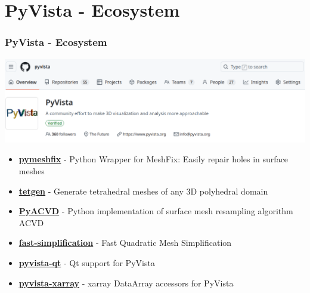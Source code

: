 \documentclass[t]{beamer}
\begin{document}
\section{PyVista - Ecosystem}

\begin{frame}

    \frametitle{PyVista - Ecosystem}
    \includegraphics[width=1.0\textwidth]{figures/pyvista-repo.png}

    \begin{itemize}[leftmargin=10pt, label=•]
        \item \textbf{\href{https://github.com/pyvista/pymeshfix}{pymeshfix}} - Python Wrapper for MeshFix: Easily repair holes in surface meshes
        \item \textbf{\href{https://github.com/pyvista/tetgen}{tetgen}} - Generate tetrahedral meshes of any 3D polyhedral domain
        \item \textbf{\href{https://github.com/pyvista/PyACVD}{PyACVD}} - Python implementation of surface mesh resampling algorithm ACVD
        \item \textbf{\href{https://github.com/pyvista/fast-simplification}{fast-simplification}} - Fast Quadratic Mesh Simplification
        \item \textbf{\href{https://github.com/pyvista/pyvista-qt}{pyvista-qt}} - Qt support for PyVista
        \item \textbf{\href{https://github.com/pyvista/pyvista-xarray}{pyvista-xarray}} - xarray DataArray accessors for PyVista
    \end{itemize}

\end{frame}

\end{document}
